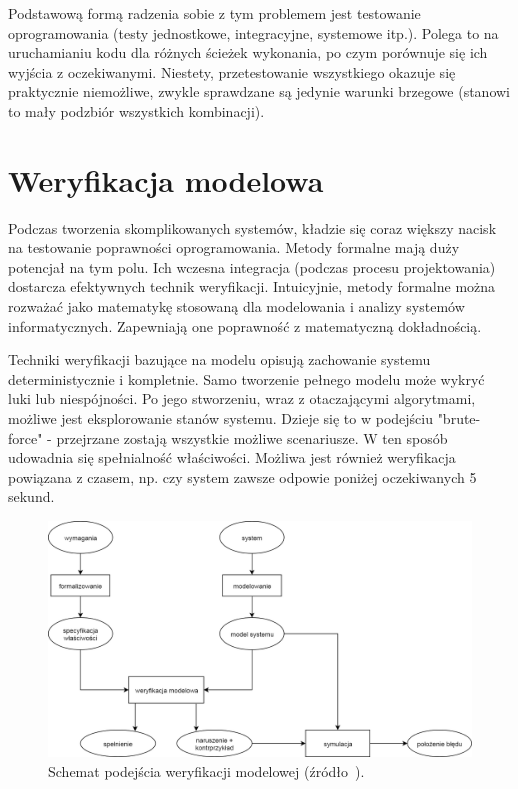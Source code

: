 Podstawową formą radzenia sobie z tym problemem jest testowanie oprogramowania (testy jednostkowe, integracyjne, systemowe itp.). Polega to na uruchamianiu kodu dla różnych ścieżek wykonania, po czym porównuje się ich wyjścia z oczekiwanymi. Niestety, przetestowanie wszystkiego okazuje się praktycznie niemożliwe, zwykle sprawdzane są jedynie warunki brzegowe (stanowi to mały podzbiór wszystkich kombinacji). 


\section{Weryfikacja modelowa}

Podczas tworzenia skomplikowanych systemów, kładzie się coraz większy nacisk na testowanie poprawności oprogramowania. Metody formalne mają duży potencjał na tym polu. Ich wczesna integracja (podczas procesu projektowania) dostarcza efektywnych technik weryfikacji.
Intuicyjnie, metody formalne można rozważać jako matematykę stosowaną dla modelowania i analizy systemów informatycznych. Zapewniają one poprawność z matematyczną dokładnością.

Techniki weryfikacji bazujące na modelu opisują zachowanie systemu deterministycznie i kompletnie. Samo tworzenie pełnego modelu może wykryć luki lub niespójności.
Po jego stworzeniu, wraz z otaczającymi algorytmami, możliwe jest eksplorowanie stanów systemu.
Dzieje się to w podejściu "brute-force" - przejrzane zostają wszystkie możliwe scenariusze.
W ten sposób udowadnia się spełnialność właściwości. Możliwa jest również weryfikacja powiązana z czasem, np. czy system zawsze odpowie poniżej oczekiwanych 5 sekund.

\begin{figure}[h]
    \centering
    \includegraphics[width=\textwidth,keepaspectratio]{img/model_checking_approach_schematic_view.png}
    \caption{Schemat podejścia weryfikacji modelowej (źródło~\cite{Bai08}).}
    \label{fig:model_checking_scheme}
\end{figure}

